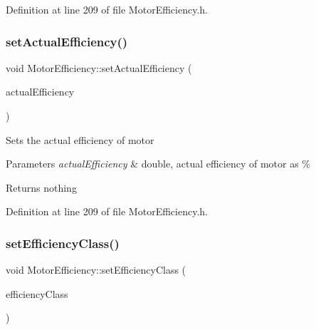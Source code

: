Definition at line 209 of file Motor\+Efficiency.\+h.

\mbox{\label{class_motor_efficiency_a7a5ad8d01fdc0a3bf93d952752487496}} 
\subsubsection{\texorpdfstring{set\+Actual\+Efficiency()}{setActualEfficiency()}\hspace{0.1cm}{\footnotesize\ttfamily [3/3]}}
{\footnotesize\ttfamily void Motor\+Efficiency\+::set\+Actual\+Efficiency (\begin{DoxyParamCaption}\item[{double}]{actual\+Efficiency }\end{DoxyParamCaption})\hspace{0.3cm}{\ttfamily [inline]}}

Sets the actual efficiency of motor


\begin{DoxyParams}{Parameters}
{\em actual\+Efficiency} & double, actual efficiency of motor as \%\\
\hline
\end{DoxyParams}
\begin{DoxyReturn}{Returns}
nothing 
\end{DoxyReturn}


Definition at line 209 of file Motor\+Efficiency.\+h.

\mbox{\label{class_motor_efficiency_a1ff4790d01bf2e65bd7bce2edc98d0c5}} 
\subsubsection{\texorpdfstring{set\+Efficiency\+Class()}{setEfficiencyClass()}\hspace{0.1cm}{\footnotesize\ttfamily [1/3]}}
{\footnotesize\ttfamily void Motor\+Efficiency\+::set\+Efficiency\+Class (\begin{DoxyParamCaption}\item[{\hyperlink{class_motor_afa022971ae062406a9f588c601673d4e}{Motor\+::\+Efficiency\+Class}}]{efficiency\+Class }\end{DoxyParamCaption})\hspace{0.3cm}{\ttfamily [inline]}}

